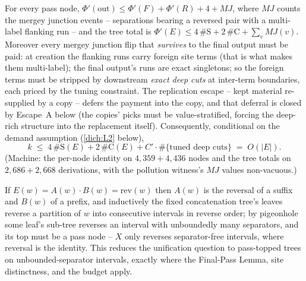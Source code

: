 \begin{lemma}
    \label{dich:lem:PAYMENT}
    For every pass node,
    $\Phi'(\mathrm{out}) \le \Phi'(F) + \Phi'(R) + 4 + MJ$, where $MJ$
    counts the mergey junction events -- separations bearing a
    reversed pair with a multi-label flanking run -- and the tree
    total is $\Phi'(E) \le 4\,\#\mathrm{S} + 2\,\#\mathrm{C} +
    \sum_v MJ(v)$.  Moreover every mergey junction flip that
    \emph{survives} to the final output must be paid: at creation the
    flanking runs carry foreign site terms (that is what makes them
    multi-label); the final output's runs are exact singletons; so the
    foreign terms must be stripped by downstream \emph{exact deep
    cuts} at inter-term boundaries, each priced by the tuning
    constraint.  The replication escape -- kept material re-supplied
    by a copy -- defers the payment into the copy, and that deferral
    is closed by Escape~A below (the copies' picks must be
    value-stratified, forcing the deep-rich structure into the
    replacement itself).  Consequently, conditional on the demand
    assumption (\ref{dich:L2} below),
    \begin{equation*}
        k \;\le\; 4\,\#\mathrm{S}(E) + 2\,\#\mathrm{C}(E) +
        C' \cdot \#\{\text{tuned deep cuts}\} \;=\; O(|E|).
    \end{equation*}
    (Machine: the per-node identity on $4{,}359 + 4{,}436$ nodes and
    the tree totals on $2{,}686 + 2{,}668$ derivations, with the
    pollution witness's $MJ$ values non-vacuous.)
\end{lemma}

\begin{lemma}
    \label{dich:lem:DECOMP}
    If $E(w) = A(w) \cdot B(w) = \mathrm{rev}(w)$ then $A(w)$ is the
    reversal of a suffix and $B(w)$ of a prefix, and inductively the
    fixed concatenation tree's leaves reverse a partition of $w$ into
    consecutive intervals in reverse order; by pigeonhole some leaf's
    sub-tree reverses an interval with unboundedly many separators,
    and its top must be a pass node -- $X$ only reverses
    separator-free intervals, where reversal is the identity.  This
    reduces the unification question to pass-topped trees on
    unbounded-separator intervals, exactly where the Final-Pass
    Lemma, site distinctness, and the budget apply.
\end{lemma}


